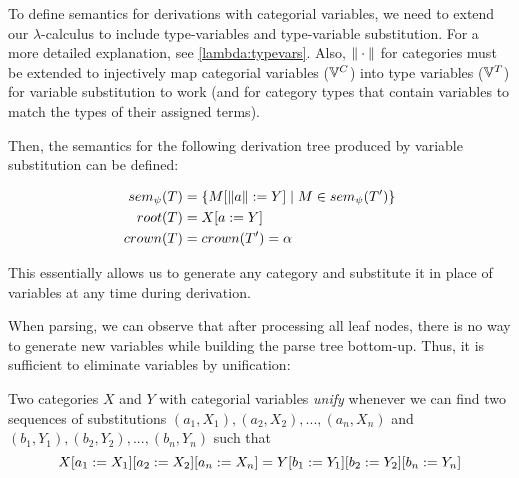 \documentclass[main.tex]{subfiles}
\begin{document}
To define semantics for derivations with categorial variables, we need to extend
our $\lambda$-calculus to include type-variables and type-variable substitution.
For a more detailed explanation, see \cref{lambda:typevars}.
Also, $\|\cdot\|$ for categories must be extended to injectively map categorial
variables ($\mathbb{V}^{C}$) into type variables ($\mathbb{V}^{T}$) for variable substitution
to work (and for category types that contain variables to match the types of
their assigned terms).

Then, the semantics for the following derivation tree produced by variable
substitution can be defined:
\begin{center}
\end{center}

\begin{align*}
    sem_{\psi}(T) &= \{ M [ \|a\| := Y ] \mid M \in sem_{\psi}(T') \} \\
    root(T) &= X [ a := Y ] \\
    crown(T) &= crown(T') = \alpha \\
\end{align*}

This essentially allows us to generate any category and substitute it in place
of variables at any time during derivation.

When parsing, we can observe that after processing all leaf nodes,
there is no way to generate new variables while building the parse tree
bottom-up. Thus, it is sufficient to eliminate variables by unification:

\begin{defn}\label{def:varunify}
Two categories $X$ and $Y$ with categorial variables \emph{unify} whenever we can
find two sequences of substitutions $(a_1, X_1), (a_2, X_2), ..., (a_n, X_n)$
and $(b_1, Y_1), (b_2, Y_2), ..., (b_n, Y_n)$ such that
\[ X [ a_1 := X_1 ] [ a_2 := X_2 ] [ a_n := X_n ]
 = Y [ b_1 := Y_1 ] [ b_2 := Y_2 ] [ b_n := Y_n ] \]
\end{defn}
\end{document}
